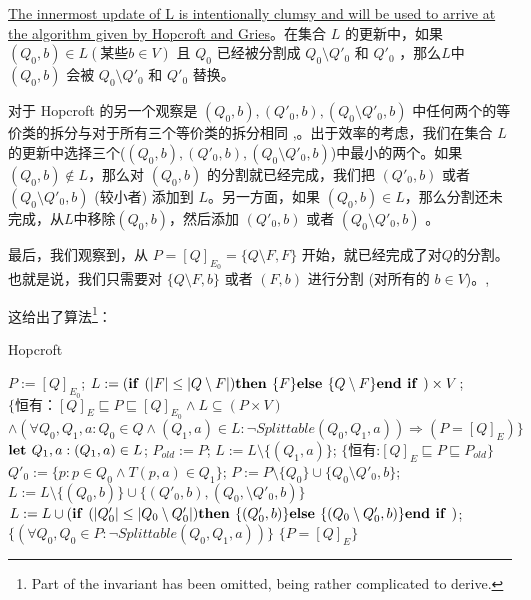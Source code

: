 \uline{The innermost update of L is intentionally clumsy and will be used to arrive at the algorithm given by Hopcroft and Gries}。在集合 $L$ 的更新中，如果 $ (Q_0,b) \in L (\mbox{某些}b \in V) $ 且 $Q_0$ 已经被分割成 $ Q_0 \setminus Q'_0 $ 和 $ Q'_0 $ ，那么$L$中 $(Q_0,b)$ 会被 $ Q_0 \setminus Q'_0 $ 和 $ Q'_0 $ 替换。

对于 Hopcroft 的另一个观察是 $ (Q_0,b),(Q'_0,b) ,(Q_0 \setminus Q'_0,b) $ 中任何两个的等价类的拆分与对于所有三个等价类的拆分相同 \cite[pp. 190-191]{Hopc71},\cite[引理 6]{Grie73}。出于效率的考虑，我们在集合 $L$ 的更新中选择三个($ (Q_0,b),(Q'_0,b) ,(Q_0 \setminus Q'_0,b) $)中最小的两个。如果 $(Q_0,b) \not\in L$，那么对 $(Q_0,b)$ 的分割就已经完成，我们把 $ (Q'_0,b) $ 或者  $ (Q_0 \setminus Q'_0,b) $ (较小者) 添加到 $L$。另一方面，如果  $(Q_0,b) \in L$，那么分割还未完成，从$L$中移除$(Q_0,b)$，然后添加 $ (Q'_0,b) $ 或者  $ (Q_0 \setminus Q'_0,b) $ 。

最后，我们观察到，从 $ P= [Q]_{E_0} = \{ Q \setminus F,F \} $ 开始，就已经完成了对$Q$的分割。也就是说，我们只需要对 $ \{ Q \setminus F,b \} $ 或者 $ (F,b) $ 进行分割 (对所有的 $b\in V$)。\cite[pp. 190-191]{Hopc71},\cite[引理 6]{Grie73}

这给出了算法\footnote{Part of the invariant has been omitted, being rather complicated to derive.}：

\begin{algorithm}
    \caption{Hopcroft}\label{al:4-8}
    \small
    \begin{algorithmic}[1]
        \State $P:=[Q]_{E_0}$;
        \State $L:= ( \mbox{\textbf{if }} ( |F| \leq |Q \setminus F | ) \mbox{\textbf{then }} \{F\} \mbox{\textbf{else }} \{ Q \setminus F \} \mbox{\textbf{end if }} ) \times V $;
        \State $\{ \mbox{恒有：} [Q]_E \sqsubseteq P \sqsubseteq [Q]_{E_0} \land L \subseteq (P \times V) $
        \State \quad $ \land (\forall Q_0,Q_1,a:Q_0 \in Q \land (Q_1,a) \in L : \neg Splittable (Q_0,Q_1,a)) \Rightarrow (P=[Q]_E) \} $
            \State $ \mbox{\textbf{let }} Q_1,a:(Q_1,a) \in L $;
            \State $ P_{old} := P $;
            \State $ L := L \setminus \{ (Q_1,a) \} $;
            \State $ \{ \mbox{恒有:} [Q]_E \sqsubseteq P \sqsubseteq P_{old} \} $
                \State $ Q'_0 := \{ p:p \in Q_0 \land T(p,a) \in Q_1 \} $;
                \State $ P:= P \setminus \{ Q_0 \} \cup \{ Q_0 \setminus Q'_0,b \} $;
                       $ L := L \setminus \{ (Q_0,b) \} \cup \{ (Q'_0,b),(Q_0, \setminus Q'_0,b ) \} $
                        \State $L:= L \cup ( \mbox{\textbf{if }} ( |Q'_0| \leq |Q_0 \setminus Q'_0 | ) \mbox{\textbf{then }} \{(Q'_0,b)\} \mbox{\textbf{else }} \{ (Q_0 \setminus Q'_0,b) \} \mbox{\textbf{end if }} ) $;
                    \EndIf
                \EndFor
            \EndFor
            \State $ \{ (\forall Q_0,Q_0 \in P : \neg Splittable(Q_0,Q_1,a)) \} $
        \Until $\{ P = [Q]_E \}$
    \end{algorithmic}
\end{algorithm}


